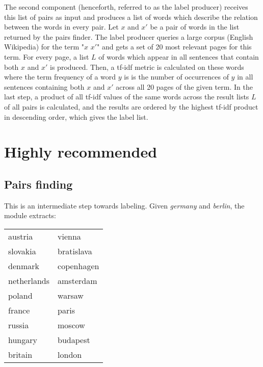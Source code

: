 \documentclass[11pt,a4paper]{article}
\begin{document}
The second component (henceforth, referred to as the label producer) receives this list of pairs as input and produces a list of words which describe the relation between the words in every pair. Let $x$ and $x'$ be a pair of words in the list returned by the pairs finder. The label producer queries a large corpus (English Wikipedia) for the term "$x$ $x'$" and gets a set of 20 most relevant pages for this term. For every page, a list $L$ of words which appear in all sentences that contain both $x$ and $x'$ is produced. Then, a tf-idf metric is calculated on these words where the term frequency of a word $y$ is is the number of occurrences of $y$ in all sentences containing both $x$ and $x'$ across all 20 pages of the given term. In the last step, a product of all tf-idf values of the same words across the result lists $L$ of all pairs is calculated, and the results are ordered by the highest tf-idf product in descending order, which gives the label list.
\section{Highly recommended}
\subsection{Pairs finding}
This is an intermediate step towards labeling. Given \textit{germany} and \textit{berlin}, the module extracts:
\begin{tabular}{ l l }
  austria & vienna \\
  slovakia & bratislava \\
  denmark & copenhagen \\
  netherlands & amsterdam \\
  poland & warsaw \\
  france & paris \\
  russia & moscow \\
  hungary & budapest \\
  britain & london

\end{tabular}
\end{document}
